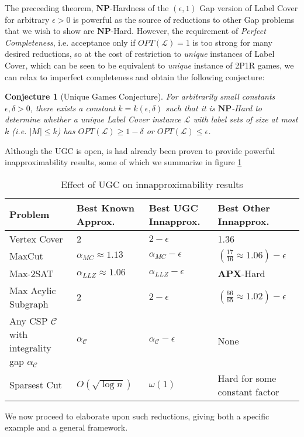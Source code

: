 \documentclass{article}
\newtheorem{conjecture}{Conjecture}
\newcommand{\NP}{\ensuremath{\mathbf{NP}}}
\newcommand{\APX}{\ensuremath{\mathbf{APX}}}
\newcommand{\C}{\ensuremath{\mathcal{C}}}
\renewcommand{\a}{\alpha}
\renewcommand{\d}{\delta}
\newcommand{\e}{\epsilon}
\renewcommand{\L}{\ensuremath{\mathcal{L}}}
\newcommand{\OPT}{\ensuremath{\mathit{OPT}}}
\begin{document}
The preceeding theorem, $\NP$-Hardness of the $(\e, 1)$ Gap version of Label Cover for arbitrary $\e > 0$ is powerful as the source of reductions to other Gap problems that we wish to show are $\NP$-Hard. However, the requirement of \textit{Perfect Completeness}, i.e. acceptance only if $\OPT(\L) = 1$ is too strong for many desired reductions, so at the cost of restriction to \textit{unique} instances of Label Cover, which can be seen to be equivalent to \textit{unique} instance of 2P1R games, we can relax to imperfect completeness and obtain the following conjecture:
\begin{conjecture}[Unique Games Conjecture]
  For arbitrarily small constants $\e, \d > 0$, there exists a constant $k = k(\e, \d)$ such that it is \NP-Hard to determine whether a unique Label Cover instance $\L$ with label sets of size at most $k$ (i.e. $|M| \le k$) has $\OPT(\L) \ge 1 - \d$ or $\OPT(\L) \le \e$.
\end{conjecture}

Although the UGC is open, is had already been proven to provide powerful inapproximability results, some of which we summarize in figure \ref{ugctable}

\begin{table}[]
  \centering
  \begin{tabular}{|p{2.5cm}|p{2.5cm}|p{2cm}|p{2.5cm}|}
    \hline 
    \textbf{Problem} & \textbf{Best Known Approx.} & \textbf{Best UGC Innapprox.} & \textbf{Best Other Innapprox.} \\\hline
    Vertex Cover & 2 & $2 - \e$ & 1.36 \\\hline
    MaxCut & $\a_{MC} \approx 1.13$ & $\a_{MC} - \e$ & $(\frac{17}{16} \approx 1.06) - \e$ \\\hline
    Max-2SAT &$\a_{LLZ} \approx 1.06$ & $\a_{LLZ} - \e$ & \APX-Hard \\\hline
    Max Acylic Subgraph & 2 & $ 2 - \e$ & $(\frac{66}{65} \approx 1.02)- \e$ \\\hline
    Any CSP $\mathcal{C}$ with integrality gap $\a_\C$ & $\a_\C$ & $\a_\C - \e$ & None \\\hline
    Sparsest Cut & $O(\sqrt{\log{n}})$ & $\omega(1)$ & Hard for some constant factor\\\hline
  \end{tabular}
  \caption{Effect of UGC on innapproximability results}
  \label{ugctable}
\end{table}

We now proceed to elaborate upon such reductions, giving both a specific example and a general framework.
\end{document}
